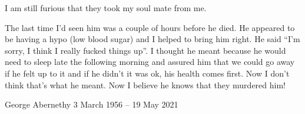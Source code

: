 {I am still furious that they took my soul mate from me.

The last time I’d seen him was a couple of hours before he died. He appeared to be having a hypo (low blood sugar) and I helped to bring him right. He said “I’m sorry, I think I really fucked things up”. I thought he meant because he would need to sleep late the following morning and assured him that we could go away if he felt up to it and if he didn’t it was ok, his health comes first. Now I don’t think that’s what he meant. Now I believe he knows that they murdered him!

George Abernethy 3 March 1956 – 19 May 2021 
}
